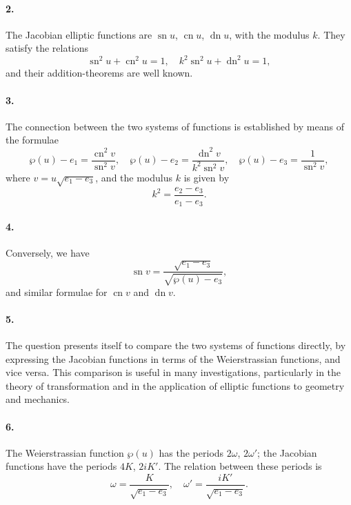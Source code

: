 \documentclass[11pt,a4paper]{article}
\theoremstyle{definition}
\begin{document}
\paragraph{2.} The Jacobian elliptic functions are $
\operatorname{sn} u$, $\operatorname{cn} u$, $\operatorname{dn} u$, with the modulus $k$. They satisfy the relations
\[
\operatorname{sn}^{2}u + \operatorname{cn}^{2}u = 1, \quad k^{2}\operatorname{sn}^{2}u + \operatorname{dn}^{2}u = 1,
\]
and their addition-theorems are well known.

\paragraph{3.} The connection between the two systems of functions is established by means of the formulae
\[
\wp(u) - e_{1} = \frac{\operatorname{cn}^{2}v}{\operatorname{sn}^{2}v}, \quad
\wp(u) - e_{2} = \frac{\operatorname{dn}^{2}v}{k^{2}\operatorname{sn}^{2}v}, \quad
\wp(u) - e_{3} = \frac{1}{\operatorname{sn}^{2}v},
\]
where $v = u\sqrt{e_{1} - e_{3}}$, and the modulus $k$ is given by
\[
k^{2} = \frac{e_{2} - e_{3}}{e_{1} - e_{3}}.
\]

\paragraph{4.} Conversely, we have
\[
\operatorname{sn} v = \frac{\sqrt{e_{1} - e_{3}}}{\sqrt{\wp(u) - e_{3}}},
\]
and similar formulae for $\operatorname{cn} v$ and $\operatorname{dn} v$.

\paragraph{5.} The question presents itself to compare the two systems of functions directly, by expressing the Jacobian functions in terms of the Weierstrassian functions, and vice versa\@. This comparison is useful in many investigations, particularly in the theory of transformation and in the application of elliptic functions to geometry and mechanics.

\paragraph{6.} The Weierstrassian function $\wp(u)$ has the periods $2\omega$, $2\omega'$; the Jacobian functions have the periods $4K$, $2iK'$. The relation between these periods is
\[
\omega = \frac{K}{\sqrt{e_{1} - e_{3}}}, \quad \omega' = \frac{iK'}{\sqrt{e_{1} - e_{3}}}.
\]
\end{document}
